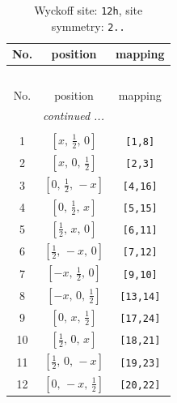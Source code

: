 \documentclass[fleqn,8pt]{jsarticle}
\begin{document}
\begin{longtable}{ccc}
\caption{Wyckoff site: {\tt 12h}, site symmetry: {\tt 2..}}
 \\
 \hline \hline
No. & position & mapping \\ \hline \endfirsthead

\multicolumn{2}{l}{\tablename\ \thetable{}} \\
 \hline \hline
No. & position & mapping \\ \hline \endhead

 \hline \hline
\multicolumn{2}{r}{\footnotesize\it continued ...} \\ \endfoot

 \hline \hline
\multicolumn{2}{r}{} \\ \endlastfoot

1 & $\left[ x,\, \frac{1}{2},\, 0 \right]$ & {\tt [1,8]} \\ \hline
2 & $\left[ x,\, 0,\, \frac{1}{2} \right]$ & {\tt [2,3]} \\ \hline
3 & $\left[ 0,\, \frac{1}{2},\, - x \right]$ & {\tt [4,16]} \\ \hline
4 & $\left[ 0,\, \frac{1}{2},\, x \right]$ & {\tt [5,15]} \\ \hline
5 & $\left[ \frac{1}{2},\, x,\, 0 \right]$ & {\tt [6,11]} \\ \hline
6 & $\left[ \frac{1}{2},\, - x,\, 0 \right]$ & {\tt [7,12]} \\ \hline
7 & $\left[ - x,\, \frac{1}{2},\, 0 \right]$ & {\tt [9,10]} \\ \hline
8 & $\left[ - x,\, 0,\, \frac{1}{2} \right]$ & {\tt [13,14]} \\ \hline
9 & $\left[ 0,\, x,\, \frac{1}{2} \right]$ & {\tt [17,24]} \\ \hline
10 & $\left[ \frac{1}{2},\, 0,\, x \right]$ & {\tt [18,21]} \\ \hline
11 & $\left[ \frac{1}{2},\, 0,\, - x \right]$ & {\tt [19,23]} \\ \hline
12 & $\left[ 0,\, - x,\, \frac{1}{2} \right]$ & {\tt [20,22]} \\
\end{longtable}
\renewcommand{\arraystretch}{1.2}
\end{document}
